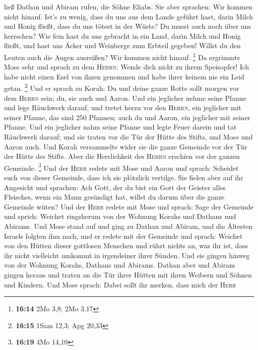 ließ Dathan und Abiram rufen, die Söhne Eliabs. Sie aber sprachen: Wir
kommen nicht hinauf.  Ist's zu wenig, dass du uns aus dem
Lande geführt hast, darin Milch und Honig fließt, dass du uns tötest in
der Wüste? Du musst auch noch über uns herrschen?  Wie
fein hast du uns gebracht in ein Land, darin Milch und Honig fließt, und
hast uns Äcker und Weinberge zum Erbteil gegeben! Willst du den Leuten
auch die Augen ausreißen? Wir kommen nicht hinauf. \footnote{\textbf{16:14}
  2Mo 3,8; 2Mo 3,17}  Da ergrimmte Mose sehr und sprach
zu dem \textsc{Herrn}: Wende dich nicht zu ihrem Speisopfer! Ich habe
nicht einen Esel von ihnen genommen und habe ihrer keinem nie ein Leid
getan. \footnote{\textbf{16:15} 1Sam 12,3; Apg 20,33} 
Und er sprach zu Korah: Du und deine ganze Rotte sollt morgen vor dem
\textsc{Herrn} sein; du, sie auch und Aaron.  Und ein
jeglicher nehme seine Pfanne und lege Räuchwerk darauf, und tretet herzu
vor den \textsc{Herrn}, ein jeglicher mit seiner Pfanne, das sind 250
Pfannen; auch du und Aaron, ein jeglicher mit seiner Pfanne.
 Und ein jeglicher nahm seine Pfanne und legte Feuer
darein und tat Räuchwerk darauf; und sie traten vor die Tür der Hütte
des Stifts, und Mose und Aaron auch.  Und Korah
versammelte wider sie die ganze Gemeinde vor der Tür der Hütte des
Stifts. Aber die Herrlichkeit des \textsc{Herrn} erschien vor der ganzen
Gemeinde. \footnote{\textbf{16:19} 4Mo 14,10}  Und der
\textsc{Herr} redete mit Mose und Aaron und sprach: 
Scheidet euch von dieser Gemeinde, dass ich sie plötzlich vertilge.
 Sie fielen aber auf ihr Angesicht und sprachen: Ach
Gott, der du bist ein Gott der Geister alles Fleisches, wenn ein Mann
gesündigt hat, willst du darum über die ganze Gemeinde wüten?
 Und der \textsc{Herr} redete mit Mose und sprach:
 Sage der Gemeinde und sprich: Weichet ringsherum von der
Wohnung Korahs und Dathans und Abirams.  Und Mose stand
auf und ging zu Dathan und Abiram, und die Ältesten Israels folgten ihm
nach,  und er redete mit der Gemeinde und sprach: Weichet
von den Hütten dieser gottlosen Menschen und rührt nichts an, was ihr
ist, dass ihr nicht vielleicht umkommt in irgendeiner ihrer Sünden.
 Und sie gingen hinweg von der Wohnung Korahs, Dathans
und Abirams. Dathan aber und Abiram gingen heraus und traten an die Tür
ihrer Hütten mit ihren Weibern und Söhnen und Kindern. 
Und Mose sprach: Dabei sollt ihr merken, dass mich der \textsc{Herr}
